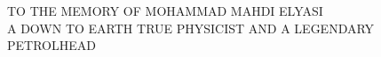 
\chapter*{}



\begin{center}
    \thispagestyle{empty}
    \vspace*{\fill}
    \large TO THE MEMORY OF MOHAMMAD MAHDI ELYASI\\
    A DOWN TO EARTH TRUE PHYSICIST AND A LEGENDARY PETROLHEAD
    \vspace*{\fill}
\end{center}

\endinput